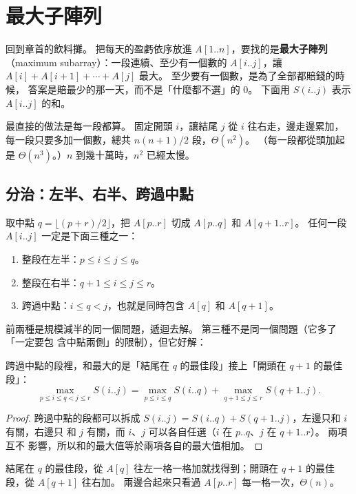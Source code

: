 \section{最大子陣列}
\label{sec:dc-maxsub}

回到章首的飲料攤。 把每天的盈虧依序放進 $A[1..n]$，要找的是\textbf{最大子陣列}
（maximum subarray）：一段連續、至少有一個數的 $A[i..j]$，讓
$A[i] + A[i+1] + \cdots + A[j]$ 最大。 至少要有一個數，是為了全部都賠錢的時候，
答案是賠最少的那一天，而不是「什麼都不選」的 $0$。 下面用 $S(i..j)$ 表示
$A[i..j]$ 的和。

最直接的做法是每一段都算。 固定開頭 $i$，讓結尾 $j$ 從 $i$ 往右走，邊走邊累加，
每一段只要多加一個數，總共 $n(n+1)/2$ 段，$\Theta(n^2)$。 （每一段都從頭加起是
$\Theta(n^3)$。）$n$ 到幾十萬時，$n^2$ 已經太慢。

\subsection{分治：左半、右半、跨過中點}

取中點 $q = \lfloor (p + r)/2 \rfloor$，把 $A[p..r]$ 切成 $A[p..q]$ 和
$A[q+1..r]$。 任何一段 $A[i..j]$ 一定是下面三種之一：

\begin{enumerate}
\item 整段在左半：$p \le i \le j \le q$。
\item 整段在右半：$q + 1 \le i \le j \le r$。
\item 跨過中點：$i \le q < j$，也就是同時包含 $A[q]$ 和 $A[q+1]$。
\end{enumerate}

前兩種是規模減半的同一個問題，遞迴去解。 第三種不是同一個問題（它多了「一定要包
含中點兩側」的限制），但它好解：

\begin{lemma}
\label{lem:dc-crossing}
跨過中點的段裡，和最大的是「結尾在 $q$ 的最佳段」接上「開頭在 $q+1$ 的最佳段」：
\[
\max_{p \le i \le q < j \le r} S(i..j)
= \max_{p \le i \le q} S(i..q) + \max_{q+1 \le j \le r} S(q+1..j).
\]
\end{lemma}

\begin{proof}
跨過中點的段都可以拆成 $S(i..j) = S(i..q) + S(q+1..j)$，左邊只和 $i$ 有關，右邊只
和 $j$ 有關，而 $i$、$j$ 可以各自任選（$i$ 在 $p..q$、$j$ 在 $q+1..r$）。 兩項互不
影響，所以和的最大值等於兩項各自的最大值相加。
\end{proof}

結尾在 $q$ 的最佳段，從 $A[q]$ 往左一格一格加就找得到；開頭在 $q+1$ 的最佳段，從
$A[q+1]$ 往右加。 兩邊合起來只看過 $A[p..r]$ 每一格一次，$\Theta(n)$。

